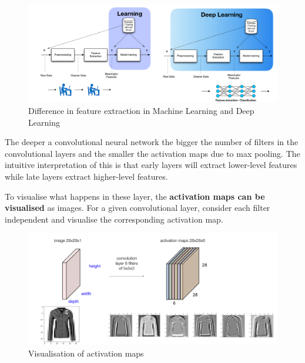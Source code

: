 \documentclass[11pt]{article}
\begin{document}
\begin{figure}[htb]
	\centering
	\includegraphics[width=0.8\linewidth]{img/machine_learning_deep_learning_feature_extraction}
	\caption{Difference in feature extraction in Machine Learning and Deep Learning}
\end{figure}

The deeper a convolutional neural network the bigger the number of filters in the convolutional layers and the smaller the activation maps due to max pooling. The intuitive interpretation of this is that early layers will extract lower-level features while late layers extract higher-level features.

To visualise what happens in these layer, the \textbf{activation maps can be visualised} as images. For a given convolutional layer, consider each filter independent and visualise the corresponding activation map.

\begin{figure}[htb]
	\centering
	\includegraphics[width=0.8\linewidth]{img/activation_maps_convolution_layer}
	\caption{Visualisation of activation maps}
\end{figure}
\end{document}
